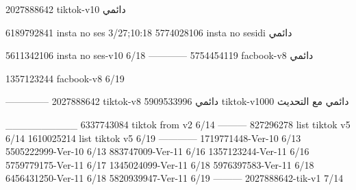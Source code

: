 2027888642 tiktok-v10
دائمي

6189792841 insta no ses
3/27;10:18
5774028106 insta no sesidi
دائمي

5611342106 insta no ses-v10
6/18
------------
5754454119 facbook-v8
دائمي

1357123244 facbook-v8
6/19

--------------
2027888642 tiktok-v8
دائمي
5909533996 tiktok-v1000
دائمي مع التحديث

__________
6337743084 tiktok from v2
6/14
---------
827296278 list tiktok v5
6/14
1610025214 list tiktok v5
6/19
------------
1719771448-Ver-10
6/13
5505222999-Ver-10
6/13
883747009-Ver-11
6/16
1357123244-Ver-11
6/16
5759779175-Ver-11
6/17
1345024099-Ver-11
6/18
5976397583-Ver-11
6/18
6456431250-Ver-11
6/18
5820939947-Ver-11
6/19
---------
2027888642-tik-v1
7/14
